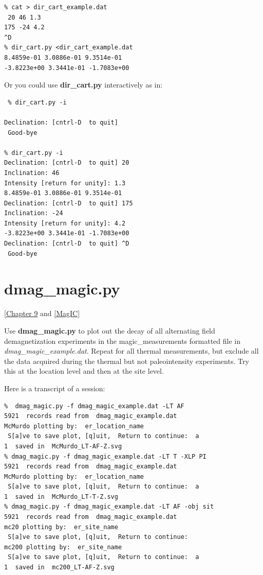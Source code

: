 \documentclass[11pt]{book}
\begin{document}
{{{{\begin{verbatim}
% cat > dir_cart_example.dat
 20 46 1.3
175 -24 4.2 
^D
% dir_cart.py <dir_cart_example.dat 
8.4859e-01 3.0886e-01 9.3514e-01
-3.8223e+00 3.3441e-01 -1.7083e+00
\end{verbatim} 

 Or you could use {\bf dir\_cart.py} interactively as in:
 
 \begin{verbatim}
 % dir_cart.py -i

Declination: [cntrl-D  to quit] 
 Good-bye 

% dir_cart.py -i
Declination: [cntrl-D  to quit] 20
Inclination: 46
Intensity [return for unity]: 1.3
8.4859e-01 3.0886e-01 9.3514e-01
Declination: [cntrl-D  to quit] 175
Inclination: -24
Intensity [return for unity]: 4.2
-3.8223e+00 3.3441e-01 -1.7083e+00
Declination: [cntrl-D  to quit] ^D
 Good-bye 
\end{verbatim}

% 
% 
 \section {\bf dmag\_magic.py}
  [\href{http://Webbookcopy.html#Getting_Direction}{Chapter 9} and \href{#MagIC}{[MagIC]}
 
Use {\bf dmag\_magic.py} to plot out the decay of all alternating field demagnetization experiments in the magic\_measurements 
formatted file in {\it dmag\_magic\_example.dat}.    Repeat for all thermal measurements, but exclude all the data acquired during the thermal but not  paleointensity experiments.   Try this at the location level and then at the site level. 

Here is a transcript of a session:

\begin{verbatim}
%  dmag_magic.py -f dmag_magic_example.dat -LT AF
5921  records read from  dmag_magic_example.dat
McMurdo plotting by:  er_location_name
 S[a]ve to save plot, [q]uit,  Return to continue:  a
1  saved in  McMurdo_LT-AF-Z.svg
% dmag_magic.py -f dmag_magic_example.dat -LT T -XLP PI
5921  records read from  dmag_magic_example.dat
McMurdo plotting by:  er_location_name
 S[a]ve to save plot, [q]uit,  Return to continue:  a
1  saved in  McMurdo_LT-T-Z.svg
% dmag_magic.py -f dmag_magic_example.dat -LT AF -obj sit
5921  records read from  dmag_magic_example.dat
mc20 plotting by:  er_site_name
 S[a]ve to save plot, [q]uit,  Return to continue:   
mc200 plotting by:  er_site_name
 S[a]ve to save plot, [q]uit,  Return to continue:  a
1  saved in  mc200_LT-AF-Z.svg


\end{verbatim}}}}}
\end{document}
